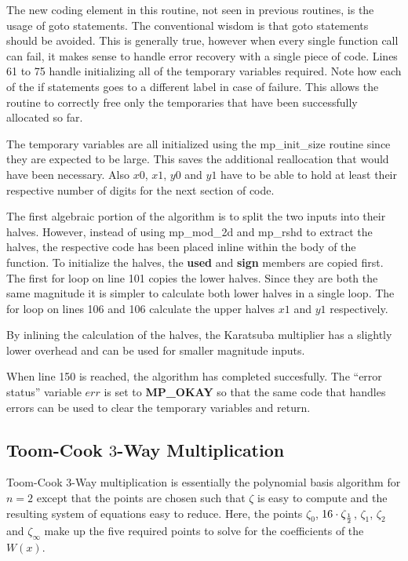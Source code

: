 \documentclass[b5paper]{book}
\begin{document}
The new coding element in this routine, not  seen in previous routines, is the usage of goto statements.  The conventional
wisdom is that goto statements should be avoided.  This is generally true, however when every single function call can fail, it makes sense
to handle error recovery with a single piece of code.  Lines 61 to 75 handle initializing all of the temporary variables 
required.  Note how each of the if statements goes to a different label in case of failure.  This allows the routine to correctly free only
the temporaries that have been successfully allocated so far.

The temporary variables are all initialized using the mp\_init\_size routine since they are expected to be large.  This saves the 
additional reallocation that would have been necessary.  Also $x0$, $x1$, $y0$ and $y1$ have to be able to hold at least their respective
number of digits for the next section of code.

The first algebraic portion of the algorithm is to split the two inputs into their halves.  However, instead of using mp\_mod\_2d and mp\_rshd
to extract the halves, the respective code has been placed inline within the body of the function.  To initialize the halves, the \textbf{used} and 
\textbf{sign} members are copied first.  The first for loop on line 101 copies the lower halves.  Since they are both the same magnitude it 
is simpler to calculate both lower halves in a single loop.  The for loop on lines 106 and 106 calculate the upper halves $x1$ and 
$y1$ respectively.

By inlining the calculation of the halves, the Karatsuba multiplier has a slightly lower overhead and can be used for smaller magnitude inputs.

When line 150 is reached, the algorithm has completed succesfully.  The ``error status'' variable $err$ is set to \textbf{MP\_OKAY} so that
the same code that handles errors can be used to clear the temporary variables and return.  

\subsection{Toom-Cook $3$-Way Multiplication}
Toom-Cook $3$-Way \cite{TOOM} multiplication is essentially the polynomial basis algorithm for $n = 2$ except that the points  are 
chosen such that $\zeta$ is easy to compute and the resulting system of equations easy to reduce.  Here, the points $\zeta_{0}$, 
$16 \cdot \zeta_{1 \over 2}$, $\zeta_1$, $\zeta_2$ and $\zeta_{\infty}$ make up the five required points to solve for the coefficients 
of the $W(x)$.
\end{document}
